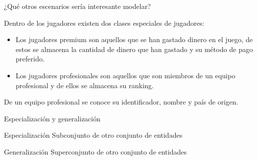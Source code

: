 \begin{frame}{¿Qu\'e otros escenarios ser\'ia interesante modelar?}
    \begin{block}{}
        Dentro de los {jugadores} existen dos clases especiales de jugadores:
        \begin{itemize}
            \item   Los {jugadores premium}
             son aquellos que se han gastado dinero en el juego, de estos se almacena
            la {cantidad de dinero que han gastado} y su m\'etodo de pago preferido.

            \item  Los {jugadores profesionales} son aquellos que {son miembros} de un
            {equipo profesional} y de ellos se almacena su {ranking}.
        \end{itemize}
        De un equipo profesional se conoce su {\color<2>{attr}identificador}, 
        {nombre} y {pa\'is} de origen.
      
        
     
    \end{block}
\end{frame}

\begin{frame}{Especializaci\'on y generalizaci\'on}
    \begin{block}{Especializaci\'on}
        Subconjunto de otro conjunto de entidades
        \vspace{5mm}

        \centering
    \end{block}

    


    \begin{block}{Generalizaci\'on}
        Superconjunto de otro conjunto de entidades
        \vspace{5mm}

        \centering
    \end{block}


    

\end{frame}


